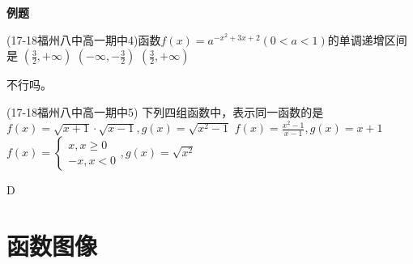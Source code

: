 \startexercise
\begin{exercise}{\large \bf 例\hspace{0.6em}题}
\item (17-18福州八中高一期中4)函数$f(x)=a^{-x^2+3x+2}(0<a<1)$的单调递增区间是\xz
        {$(\frac32,+\infty)$}
        {$(-\infty,-\frac32)$} 
        {$(\frac32,+\infty)$}
\begin{answer}
不行吗。
\end{answer}
\item  (17-18福州八中高一期中5) 下列四组函数中，表示同一函数的是\xz
        {$f(x)=\sqrt{x+1}\cdot\sqrt{x-1},g(x)=\sqrt{x^2-1}$}
        {$f(x)=\frac{x^2-1}{x-1},g(x)=x+1$}
        {$f(x)=\begin{cases}x,x\geq0\\-x,x<0\end{cases},g(x)=\sqrt{x^2}$}
\begin{answer}
D
\end{answer}
\end{exercise}


\section{函数图像}
\section{}

\stopexercise